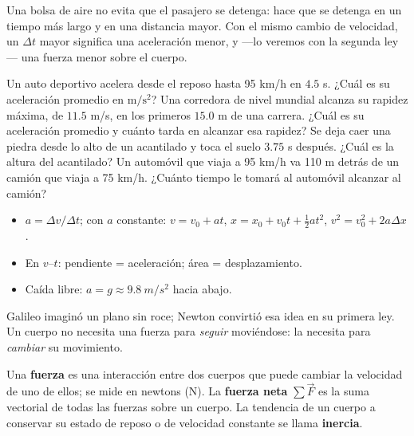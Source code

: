 \documentclass[11pt]{article}
\begin{document}
\begin{aplicacion}
Una bolsa de aire no evita que el pasajero se detenga: hace que se detenga en un tiempo más
largo y en una distancia mayor. Con el mismo cambio de velocidad, un $\Delta t$ mayor significa
una aceleración menor, y ---lo veremos con la segunda ley--- una fuerza menor sobre el cuerpo.
\end{aplicacion}

\begin{preguntas}
\pregunta Un auto deportivo acelera desde el reposo hasta 95 km/h en $\num{4,5}$ s. ¿Cuál es su
aceleración promedio en $\mathrm{m/s^2}$?
\espacio{2cm}
\pregunta Una corredora de nivel mundial alcanza su rapidez máxima, de $\num{11,5}$ m/s, en los
primeros $\num{15,0}$ m de una carrera. ¿Cuál es su aceleración promedio y cuánto tarda en
alcanzar esa rapidez?
\espacio{3cm}
\pregunta Se deja caer una piedra desde lo alto de un acantilado y toca el suelo $\num{3,75}$ s
después. ¿Cuál es la altura del acantilado?
\espacio{2cm}
\pregunta Un automóvil que viaja a 95 km/h va 110 m detrás de un camión que viaja a 75 km/h.
¿Cuánto tiempo le tomará al automóvil alcanzar al camión?
\espacio{2.5cm}
\end{preguntas}

\begin{resumen}
\begin{itemize}
  \item $a = \Delta v/\Delta t$; con $a$ constante: $v = v_0 + at$,
        $x = x_0 + v_0t + \frac12 at^2$, $v^2 = v_0^2 + 2a\Delta x$.
  \item En $v$--$t$: pendiente = aceleración; área = desplazamiento.
  \item Caída libre: $a = g \approx \qty{9,8}{m/s^2}$ hacia abajo.
\end{itemize}
\end{resumen}

\label{tema:primeraley}

\begin{hilo}
Galileo imaginó un plano sin roce; Newton convirtió esa idea en su primera ley. Un cuerpo no
necesita una fuerza para \emph{seguir} moviéndose: la necesita para \emph{cambiar} su
movimiento.
\end{hilo}

Una \textbf{fuerza} es una interacción entre dos cuerpos que puede cambiar la velocidad de uno
de ellos; se mide en newtons (N). La \textbf{fuerza neta} $\sum\vec F$ es la suma vectorial de
todas las fuerzas sobre un cuerpo. La tendencia de un cuerpo a conservar su estado de reposo o
de velocidad constante se llama \textbf{inercia}.
\end{document}
